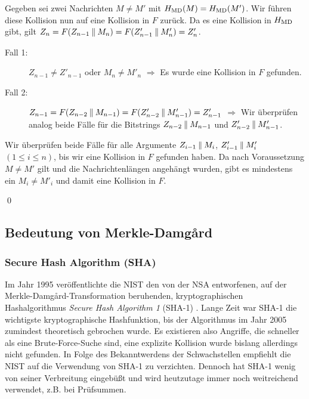 \begin{beweis}\label{md-proof}
Gegeben sei zwei Nachrichten $M \neq M'$ mit $H_{\textnormal{MD}}(M) = H_{\textnormal{MD}}(M')$. Wir führen diese Kollision nun auf eine Kollision in $F$ zurück. 
Da es eine Kollision in $H_{\textnormal{MD}}$ gibt, gilt $Z_{n} = F(Z_{n-1} \mathbin{\|} M_{n}) = F(Z'_{n-1} \mathbin{\|} M'_{n}) = Z'_{n}$.
\begin{description}
	\item[Fall 1:] $Z_{n-1} \neq Z'_{n-1}$ oder $M_{n} \neq M'_{n}$ $\Rightarrow$ Es wurde eine Kollision in $F$ gefunden. 
	\item[Fall 2:] $Z_{n-1} = F(Z_{n-2} \mathbin{\|} M_{n-1}) = F(Z'_{n-2} \mathbin{\|} M'_{n-1}) = Z'_{n-1}$ $\Rightarrow$ Wir überprüfen analog beide Fälle für die Bitstrings $Z_{n-2} \mathbin{\|} M_{n-1}$ und $Z'_{n-2} \mathbin{\|} M'_{n-1}$.
\end{description}
Wir überprüfen beide Fälle für alle Argumente $Z_{i-1} \mathbin{\|} M_{i}$, $Z'_{i-1} \mathbin{\|} M'_{i}$ $(1 \leq i \leq n)$, bis wir eine Kollision in $F$ gefunden haben. Da nach Voraussetzung $M \neq M'$ gilt und die Nachrichtenlängen angehängt wurden, gibt es mindestens ein $M_{i} \neq M'_{i}$ und damit eine Kollision in $F$.

\qed
\end{beweis}

\subsection{Bedeutung von Merkle-Damgård}
\subsubsection{Secure Hash Algorithm (SHA)}
Im Jahr 1995 veröffentlichte die NIST den von der NSA entworfenen, auf der Merkle-Damgård-Transformation beruhenden, kryptographischen Hashalgorithmus \emph{Secure Hash Algorithm 1} (SHA-1) \cite{NIST_SHA95}. Lange Zeit war SHA-1 die wichtigste kryptographische Hashfunktion, bis der Algorithmus im Jahr 2005 zumindest theoretisch gebrochen wurde. Es existieren also Angriffe, die schneller als eine Brute-Force-Suche sind, eine explizite Kollision wurde bislang allerdings nicht gefunden. In Folge des Bekanntwerdens der Schwachstellen empfiehlt die NIST auf die Verwendung von SHA-1 zu verzichten. Dennoch hat SHA-1 wenig von seiner Verbreitung eingebüßt und wird heutzutage immer noch weitreichend verwendet, z.B. bei Prüfsummen.

